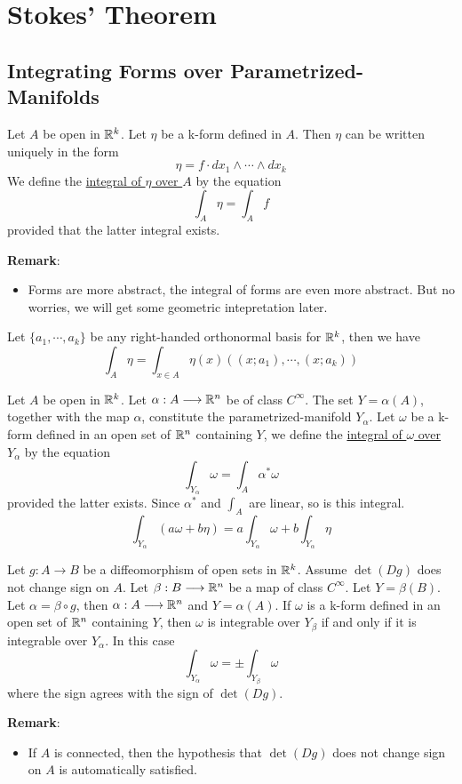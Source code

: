 \chapter{Stokes' Theorem}

\section{Integrating Forms over Parametrized-Manifolds}
\begin{definition}
    Let $A$ be open in $\mathbb{R}^k$. Let $\eta$ be a k-form defined in $A$. Then $\eta$ can be written uniquely in the form 
    $$\eta =f\cdot dx_1\wedge \cdots \wedge dx_k$$
    We define the \underline{integral of $\eta$ over $A$} by the equation $$\int_A\eta=\int_Af$$
    provided that the latter integral exists.
\end{definition}
\noindent\textbf{Remark}:
\begin{itemize}
    \item Forms are more abstract, the integral of forms are even more abstract. But no worries, we will get some geometric intepretation later.
\end{itemize}

\begin{theorem}
    Let $\{a_1,\cdots,a_k\}$ be any right-handed orthonormal basis for $\mathbb{R}^k$, then we have 
    $$\int_A\eta=\int_{x\in A}\eta(x)((x;a_1),\cdots,(x;a_k))$$
\end{theorem}

\begin{definition}
    Let $A$ be open in $\mathbb{R}^k$. Let $\alpha:A\longrightarrow\mathbb{R}^n$ be of class $C^{\infty}$. 
    The set $Y=\alpha(A)$, together with the map $\alpha$, constitute the parametrized-manifold $Y_{\alpha}$. 
    Let $\omega$ be a k-form defined in an open set of $\mathbb{R}^n$ containing $Y$, we define the \underline{integral of $\omega$ over $Y_{\alpha}$} by the equation 
    $$\int_{Y_{\alpha}}\omega=\int_A\alpha^*\omega$$
    provided the latter exists. Since $\alpha^*$ and $\int_A$ are linear, so is this integral.
    $$\int_{Y_{\alpha}}(a\omega+b\eta)=a\int_{Y_{\alpha}}\omega+b\int_{Y_{\alpha}}\eta$$
\end{definition}

\begin{theorem}
    Let $g:A\longrightarrow B$ be a diffeomorphism of open sets in $\mathbb{R}^k$. 
    Assume $\det(Dg)$ does not change sign on $A$. 
    Let $\beta:B\longrightarrow\mathbb{R}^n$ be a map of class $C^{\infty}$. 
    Let $Y=\beta(B)$. Let $\alpha=\beta\circ g$, then $\alpha:A\longrightarrow\mathbb{R}^n$ and $Y=\alpha(A)$. 
    If $\omega$ is a k-form defined in an open set of $\mathbb{R}^n$ containing $Y$, then $\omega$ is integrable over $Y_{\beta}$ if and only if it is integrable over $Y_{\alpha}$. In this case 
    $$\int_{Y_{\alpha}}\omega=\pm \int_{Y_{\beta}}\omega$$
    where the sign agrees with the sign of $\det(Dg)$.
\end{theorem}
\noindent\textbf{Remark}:
\begin{itemize}
    \item If $A$ is connected, then the hypothesis that $\det(Dg)$ does not change sign on $A$ is automatically satisfied.
\end{itemize}

